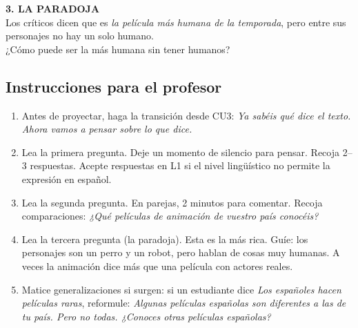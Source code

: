\documentclass[a4paper,11pt]{article}
\begin{document}
\vspace{0.4cm}

\noindent\colorbox{naranja!10}{\parbox{\dimexpr\linewidth-2\fboxsep}{%
\textbf{\textcolor{naranja}{3. LA PARADOJA}}\\[0.2cm]
Los críticos dicen que es \textit{la película más humana de la temporada}, pero entre sus personajes no hay un solo humano.\\[0.1cm]
¿Cómo puede ser la más humana sin tener humanos?
}}

\vspace{0.5cm}

\begin{center}
\end{center}

\vspace{0.5cm}

\subsection*{Instrucciones para el profesor}

\begin{enumerate}[leftmargin=1.5cm, itemsep=4pt]
\item Antes de proyectar, haga la transición desde CU3: \textit{Ya sabéis qué dice el texto. Ahora vamos a pensar sobre lo que dice.}
\item Lea la primera pregunta. Deje un momento de silencio para pensar. Recoja 2--3 respuestas. Acepte respuestas en L1 si el nivel lingüístico no permite la expresión en español.
\item Lea la segunda pregunta. En parejas, 2 minutos para comentar. Recoja comparaciones: \textit{¿Qué películas de animación de vuestro país conocéis?}
\item Lea la tercera pregunta (la paradoja). Esta es la más rica. Guíe: los personajes son un perro y un robot, pero hablan de cosas muy humanas. A veces la animación dice más que una película con actores reales.
\item Matice generalizaciones si surgen: si un estudiante dice \textit{Los españoles hacen películas raras}, reformule: \textit{Algunas películas españolas son diferentes a las de tu país. Pero no todas. ¿Conoces otras películas españolas?}
\end{enumerate}

\newpage

\end{document}
